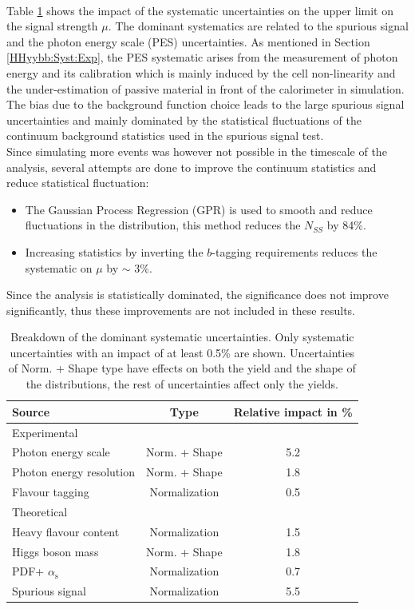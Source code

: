 \\
Table \ref{tab:HHyybb:Results:Xsec:Sys} shows the impact of the systematic uncertainties on the upper limit on the signal strength $\mu$. The dominant systematics are related to the spurious signal and the photon energy scale (PES) uncertainties. As mentioned in Section \ref{HHyybb:Syst:Exp}, the PES systematic arises from the measurement of photon energy and its calibration which is mainly induced by the cell non-linearity and the under-estimation of passive material in front of the calorimeter in simulation. The bias due to the background function choice leads to the large spurious signal uncertainties and mainly dominated by the statistical fluctuations of the continuum background statistics used in the spurious signal test. \\
Since simulating more events was however not possible in the timescale of the analysis, several attempts are done to improve the continuum statistics and reduce statistical fluctuation: 
\begin{itemize}
    \item The Gaussian Process Regression (GPR) \cite{GPR} is used to smooth and reduce fluctuations in the \myy distribution, this method reduces the $N_{SS}$ by 84\%.
    \item Increasing statistics by inverting the $b$-tagging requirements reduces the systematic on $\mu$ by $\sim$ 3\%.
\end{itemize}
Since the analysis is statistically dominated, the significance does not improve significantly, thus these improvements are not included in these results.  
\begin{table}[htbp]
    \centering
    \begin{tabular}{lcc}
\hline \hline 
Source & Type & Relative impact in \%  \\
\hline Experimental & & \\
\hline Photon energy scale & Norm. + Shape & 5.2  \\
Photon energy resolution & Norm. + Shape & 1.8  \\
Flavour tagging & Normalization & 0.5  \\
\hline Theoretical & & \\
\hline Heavy flavour content & Normalization & 1.5  \\
Higgs boson mass & Norm. + Shape & 1.8  \\
PDF+ $\alpha_{\mathrm{s}}$ & Normalization & 0.7  \\
\hline Spurious signal & Normalization & 5.5 \\
\hline \hline
\end{tabular}
    \caption{Breakdown of the dominant systematic uncertainties. Only systematic uncertainties with an impact of at least 0.5\% are shown. Uncertainties of Norm. + Shape type have effects on both the yield and the shape of the \myy distributions, the rest of uncertainties affect only the yields.}
    \label{tab:HHyybb:Results:Xsec:Sys}
\end{table}

